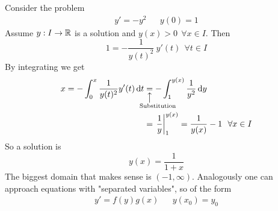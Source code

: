 \documentclass[../../script.tex]{subfiles}
\begin{document}
\begin{eg}
    Consider the problem 
    \begin{align*}
        y' = -y^2 && y(0) = 1
    \end{align*}
    Assume $y: I \rightarrow \mathbb{R}$ is a solution and $y(x) > 0 ~~\forall x \in I$. Then 
    \[
        1 = -\frac{1}{y(t)^2} ~y'(t) ~~\forall t \in I
    \]
    By integrating we get 
    \begin{align*}
        x = -\int_0^x \frac{1}{y(t)^2} y'(t) \dd{t} &\equalexpl{Substitution} -\int_1^{y(x)} \rec{y^2} \dd{y} \\
        &= \left. \rec{y} \right\vert_1^{y(x)} = \rec{y(x)} - 1 ~~\forall x \in I
    \end{align*}
    So a solution is 
    \[
        y(x) = \frac{1}{1+x}
    \]
    The biggest domain that makes sense is $(-1, \infty)$. Analogously one can approach equations with "separated variables", so of the form 
    \begin{align*}
        y' = f(y)g(x) && y(x_0) = y_0
    \end{align*}
\end{eg}
\end{document}

